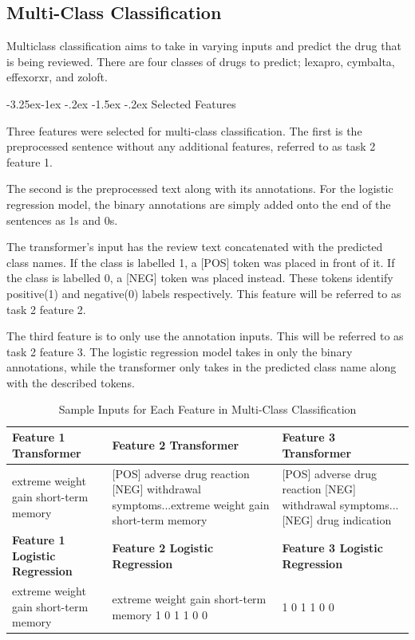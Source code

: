 \documentclass[10.7pt, onecolumn]{article}
\makeatletter
\renewcommand\subsubsection{\@startsection{subsubsection}{3}{\z@}%
	{-3.25ex\@plus -1ex \@minus -.2ex}%
    {-1.5ex \@plus -.2ex}%
    {\normalfont\itshape}}
\makeatother
\begin{document}
\subsection{Multi-Class Classification}

Multiclass classification aims to take in varying inputs and predict the drug that is being reviewed. There are four classes of drugs to predict; lexapro, cymbalta, effexorxr, and zoloft.

\subsubsection{Selected Features}

Three features were selected for multi-class classification. The first is the preprocessed sentence without any additional features, referred to as task 2 feature 1. 

The second is the preprocessed text along with its annotations. For the logistic regression model, the binary annotations are simply added onto the end of the sentences as 1s and 0s. 

The transformer's input has the review text concatenated with the predicted class names. If the class is labelled 1, a [POS] token was placed in front of it. If the class is labelled 0, a [NEG] token was placed instead. These tokens identify positive(1) and negative(0) labels respectively. This feature will be referred to as task 2 feature 2.

The third feature is to only use the annotation inputs. This will be referred to as task 2 feature 3. The logistic regression model takes in only the binary annotations, while the transformer only takes in the predicted class name along with the described tokens.

\begin{table}[H]
  \centering
  \small
  \begin{tabular}{|p{5cm}|p{5cm}|p{5cm}|}
    \hline
    \textbf{Feature 1 Transformer} & \textbf{Feature 2 Transformer} & \textbf{Feature 3 Transformer} \\
    \hline
    extreme weight gain short-term memory & [POS] adverse drug reaction [NEG] withdrawal symptoms...extreme weight gain short-term memory &[POS] adverse drug reaction [NEG] withdrawal symptoms...[NEG] drug indication\\
    \hline
    \textbf{Feature 1 Logistic Regression} & \textbf{Feature 2 Logistic Regression} & \textbf{Feature 3 Logistic Regression} \\
    \hline
    extreme weight gain short-term memory & extreme weight gain short-term memory 1 0 1 1 0 0 & 1 0 1 1 0 0\\
    \hline
  \end{tabular}
  \caption{Sample Inputs for Each Feature in Multi-Class Classification}
  \label{tab:multiclassInput}
\end{table}
\end{document}
